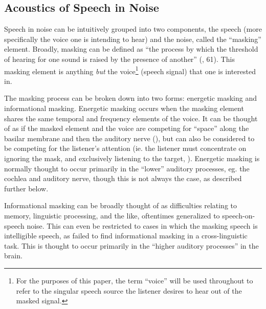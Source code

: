 \documentclass[dissertation,copyright]{uathesis}
\begin{document}
\subsection{Acoustics of Speech in Noise}

Speech in noise can be intuitively grouped into two components, the speech (more specifically the voice one is intending to hear) and the noise, called the ``masking'' element.  Broadly, masking can be defined as ``the process by which the threshold of hearing for one sound is raised by the presence of another'' (\cite{ansi:13}, 61).  This masking element is anything \textit{but} the voice\footnote{For the purposes of this paper, the term ``voice'' will be used throughout to refer to the singular speech source the listener desires to hear out of the masked signal.} (speech signal) that one is interested in.

The masking process can be broken down into two forms: energetic masking and informational masking.  Energetic masking occurs when the masking element shares the same temporal and frequency elements of the voice.  It can be thought of as if the masked element and the voice are competing for ``space'' along the basilar membrane and then the auditory nerve (\cite{brungart:01}), but can also be considered to be competing for the listener's attention (ie. the listener must concentrate on ignoring the mask, and exclusively listening to the target, \cite{mattys:12}).  Energetic masking is normally thought to occur primarily in the ``lower'' auditory processes, eg. the cochlea and auditory nerve, though this is not always the case, as described further below.  

Informational masking can be broadly thought of as difficulties relating to memory, linguistic processing, and the like, oftentimes generalized to speech-on-speech noise.  This can even be restricted to cases in which the masking speech is intelligible speech, as \cite{mattys:10} failed to find informational masking in a cross-linguistic task. This is thought to occur primarily in the ``higher auditory processes'' in the brain.
\end{document}

